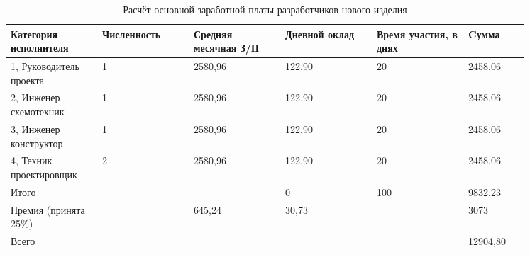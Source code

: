 \begin{table}[H]
  \small
  \caption{Расчёт основной заработной платы
    разработчиков нового изделия}
  \begin{tabular}{|p{0.15\linewidth}|p{0.15\linewidth}|p{0.15\linewidth}|p{0.15\linewidth}|p{0.15\linewidth}|p{0.1\linewidth}|}
    \hline
Категория исполнителя & Численность & Средняя месячная З/П & Дневной оклад & Время участия, в днях & Cумма\\[0pt]
\hline
    1, Руководитель проекта & 1 & 2580,96 & 122,90 & 20 & 2458,06\\[0pt]
    \hline
    2, Инженер схемотехник & 1 & 2580,96 & 122,90 & 20 & 2458,06\\[0pt]
    \hline
    3, Инженер конструктор & 1 & 2580,96 & 122,90 & 20 & 2458,06\\[0pt]
    \hline
    4, Техник проектировщик & 2 & 2580,96 & 122,90 & 20 & 2458,06\\[0pt]
    \hline
    Итого &  &  & 0 & 100 & 9832,23\\[0pt]
    \hline
    Премия (принята 25\%) &  & 645,24 & 30,73 &  & 3073 \\[0pt]
    \hline
    Всего &  &  &   &  & 12904,80\\[0pt]
    \hline
\end{tabular}
\end{table}

